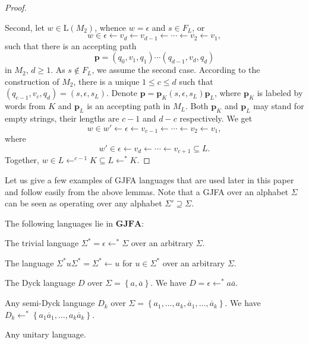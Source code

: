 \documentclass{ws-ijmpc}
\begin{document}
\begin{proof}
\begin{romanlist}
\end{romanlist}

\noindent Second, let $w\in\mathrm{L}\!\left(M_{2}\right)$, whence
$w=\epsilon$ and $s\in F_{L}$, or 
\[
w\in\epsilon\leftarrow v_{d}\leftarrow v_{d-1}\leftarrow\cdots\leftarrow v_{2}\leftarrow v_{1},
\]
such that there is an accepting path 
\[
\mathbf{p}=\left(q_{0},v_{1},q_{1}\right)\cdots\left(q_{d-1},v_{d},q_{d}\right)
\]
in $M_{2}$, $d\ge1$. As $s\notin F_{L}$, we assume the second case.
According to the construction of $M_{2}$, there is a unique $1\le c\le d$
such that $\left(q_{c-1},v_{c},q_{d}\right)=\left(s,\epsilon,s_{L}\right)$.
Denote $\mathbf{p}=\mathbf{p}_{K}\left(s,\epsilon,s_{L}\right)\mathbf{p}_{L}$,
where $\mathbf{p}_{K}$ is labeled by words from $K$ and $\mathbf{p}_{L}$
is an accepting path in $M_{L}$. Both $\mathbf{p}_{K}$ and $\mathbf{p}_{L}$
may stand for empty strings, their lengths are $c-1$ and $d-c$ respectively.
We get
\[
w\in w'\leftarrow\epsilon\leftarrow v_{c-1}\leftarrow\cdots\leftarrow v_{2}\leftarrow v_{1},
\]
where
\[
w'\in\epsilon\leftarrow v_{d}\leftarrow\cdots\leftarrow v_{c+1}\subseteq L.
\]
Together, $w\in L\leftarrow^{c-1}K\subseteq L\leftarrow^{*}K$.

\end{proof}
Let us give a few examples of GJFA languages that are used later in
this paper and follow easily from the above lemmas. Note that a GJFA
over an alphabet $\Sigma$ can be seen as operating over any alphabet
$\Sigma'\supseteq\Sigma$. 
\begin{example}
\label{The-following-languages}The following languages lie in $\mathbf{GJFA}$:
\begin{romanlist}
\item The trivial language $\Sigma^{*}=\epsilon\leftarrow^{*}\Sigma$ over
an arbitrary $\Sigma$.
\item The language $\Sigma^{*}u\Sigma^{*}=\Sigma^{*}\leftarrow u$ for $u\in\Sigma^{*}$
over an arbitrary $\Sigma$.
\item The Dyck language $D$ over $\Sigma=\left\{ a,\overline{a}\right\} $.
We have $D=\epsilon\leftarrow^{*}a\overline{a}$.
\item Any semi-Dyck language $D_{k}$ over $\Sigma=\left\{ a_{1},\dots,a_{k},\overline{a}_{1},\dots,\overline{a}_{k}\right\} $.
We have $D_{k}\leftarrow^{*}\left\{ a_{1}\overline{a}_{1},\dots,a_{k}\overline{a}_{k}\right\} $. 
\item Any unitary language.
\end{romanlist}
\end{example}
\end{document}
